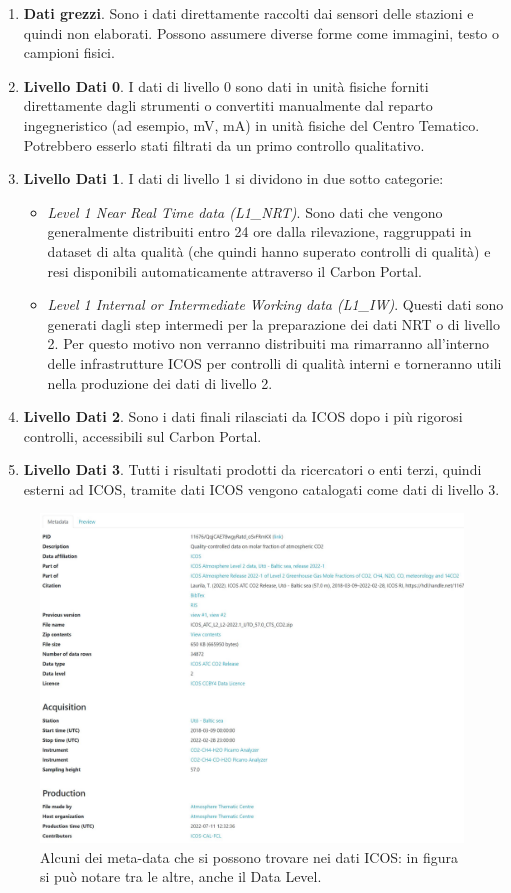 \begin{enumerate}
    \item \textbf{Dati grezzi}. Sono i dati direttamente raccolti dai sensori delle stazioni e quindi non elaborati. Possono assumere diverse forme come immagini, testo o campioni fisici.
    \item \textbf{Livello Dati 0}. I dati di livello 0
    sono dati in unità fisiche forniti direttamente dagli
    strumenti o convertiti manualmente dal reparto
    ingegneristico (ad esempio, mV, mA) in unità fisiche
    del Centro Tematico. Potrebbero esserlo stati
    filtrati da un primo controllo qualitativo.
    \item \textbf{Livello Dati 1}. I dati di livello 1 si dividono in due sotto categorie:
        \begin{itemize}
            \item \textit{Level 1 Near Real Time data (L1\_NRT)}. Sono dati che 
            vengono generalmente distribuiti entro 24 ore dalla rilevazione,
            raggruppati in dataset di alta qualità (che quindi hanno superato
            controlli di qualità) e resi disponibili automaticamente attraverso
            il Carbon Portal.  
            \item \textit{Level 1 Internal or Intermediate Working data (L1\_IW)}.
            Questi dati sono generati dagli step intermedi per la preparazione dei dati
            NRT o di livello 2. Per questo motivo non verranno distribuiti ma rimarranno
            all'interno delle infrastrutture ICOS per controlli di qualità interni
            e torneranno utili nella produzione dei dati di livello 2.
        \end{itemize} 
    \item \textbf{Livello Dati 2}. Sono i dati finali rilasciati da ICOS dopo i più rigorosi
    controlli, accessibili sul Carbon Portal.
    \item \textbf{Livello Dati 3}. Tutti i risultati prodotti da ricercatori o enti
    terzi, quindi esterni ad ICOS, tramite dati ICOS vengono catalogati come dati di livello 3.
\end{enumerate}

\begin{figure}[h!]
    \centering
    \includegraphics[height=0.36\textwidth]{figures/metaEx.JPG}
    \caption{Alcuni dei meta-data che si possono trovare nei dati ICOS: in figura si può notare tra le altre, anche il Data Level.}
    \label{figure:metadata-ex}
\end{figure}